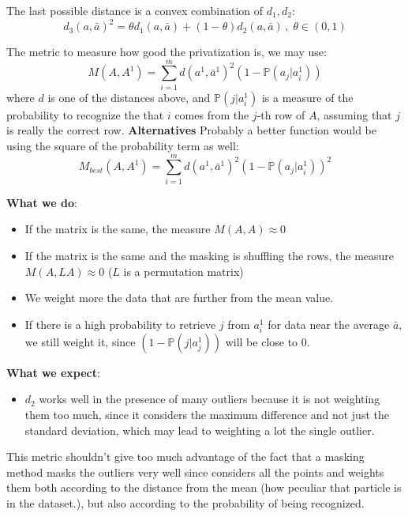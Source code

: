\documentclass{article}
\renewcommand{\P}{\mathbb{P}}
\begin{document}
The last possible distance is a convex combination of $d_1, d_2$:
\begin{equation}
	d_3(a, \bar{a})^2 = \theta d_1(a, \bar{a}) + (1 - \theta) d_2(a, \bar{a}) \, , \; \theta \in (0, 1)
\end{equation}

The metric to measure how good the privatization is, we may use:
\begin{equation}
	M(A, A^1) = \sum_{i=1}^{m} d(a^1, \bar{a}^1)^2 (1 - \P(a_j | a_i^1) )
\end{equation}
where $d$ is one of the distances above, and $\P(j | a_i^1)$ is a measure of the probability to recognize the that $i$ comes from the $j$-th row of $A$, assuming that $j$ is really the correct row. 
\textbf{Alternatives}
Probably a better function would be using the square of the probability term as well:
\begin{equation}
	M_{best}(A, A^1) = \sum_{i=1}^{m} d(a^1, \bar{a}^1)^2 (1 - \P(a_j | a_i^1) )^2
\end{equation}

\textbf{What we do}:
\begin{itemize}
	\item If the matrix is the same, the measure $M(A, A) \approx 0$
	\item If the matrix is the same and the masking is shuffling the rows, the measure $M(A, LA) \approx 0$ ($L$ is a permutation matrix)
	\item We weight more the data that are further from the mean value.
	\item If there is a high probability to retrieve $j$ from $a_i^1$ for data near the average $\bar{a}$, we still weight it, since $(1 - \P(j| a_j^1) )$ will be close to $0$.
\end{itemize}
\textbf{What we expect}:
\begin{itemize}
	\item $d_2$ works well in the presence of many outliers because it is not weighting them too much, since it considers the maximum difference and not just the standard deviation, which may lead to weighting a lot the single outlier.
\end{itemize}

This metric shouldn't give too much advantage of the fact that a masking method masks the outliers very well since considers all the points and weights them both according to the distance from the mean (how peculiar that particle is in the dataset.), but also according to the probability of being recognized.
\end{document}
